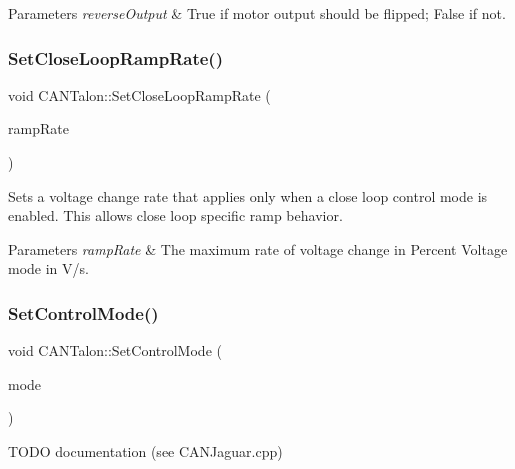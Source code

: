 \begin{DoxyParams}{Parameters}
{\em reverse\+Output} & True if motor output should be flipped; False if not. \\
\hline
\end{DoxyParams}
\mbox{\label{class_c_a_n_talon_a1390fed0cb26b604fe3b97e732a6630d}} 
\subsubsection{\texorpdfstring{Set\+Close\+Loop\+Ramp\+Rate()}{SetCloseLoopRampRate()}}
{\footnotesize\ttfamily void C\+A\+N\+Talon\+::\+Set\+Close\+Loop\+Ramp\+Rate (\begin{DoxyParamCaption}\item[{double}]{ramp\+Rate }\end{DoxyParamCaption})}

Sets a voltage change rate that applies only when a close loop control mode is enabled. This allows close loop specific ramp behavior.


\begin{DoxyParams}{Parameters}
{\em ramp\+Rate} & The maximum rate of voltage change in Percent Voltage mode in V/s. \\
\hline
\end{DoxyParams}
\mbox{\label{class_c_a_n_talon_a2b962ea4bd8e67c0d25886d8d81000b5}} 
\subsubsection{\texorpdfstring{Set\+Control\+Mode()}{SetControlMode()}}
{\footnotesize\ttfamily void C\+A\+N\+Talon\+::\+Set\+Control\+Mode (\begin{DoxyParamCaption}\item[{Control\+Mode}]{mode }\end{DoxyParamCaption})\hspace{0.3cm}{\ttfamily [virtual]}}

T\+O\+DO documentation (see C\+A\+N\+Jaguar.\+cpp) \mbox{\label{class_c_a_n_talon_abcaf3c6b5250af12b2ca411cc86e2ccc}} 
